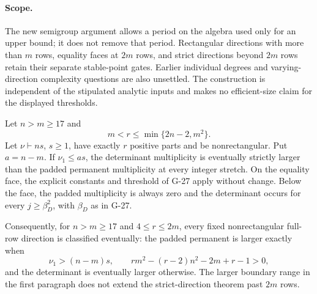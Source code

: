 \paragraph{Scope.}
The new semigroup argument allows a period on the algebra
used only for an upper bound; it does not remove that period.
Rectangular directions with more than $m$ rows, equality
faces at $2m$ rows, and strict directions beyond $2m$ rows
retain their separate stable-point gates. Earlier individual
degrees and varying-direction complexity questions are also
unsettled. The construction is independent of the stipulated
analytic inputs and makes no efficient-size claim for the
displayed thresholds.


\begin{theorem}
\label{G-28}
Let $n>m\ge17$ and
\[
                  m<r\le\min\{2n-2,m^2\}.
\]
Let $\nu\vdash ns$, $s\ge1$, have exactly $r$ positive
parts and be nonrectangular. Put $a=n-m$. If $\nu_1\le as$,
the determinant multiplicity is eventually strictly larger
than the padded permanent multiplicity at every integer
stretch. On the equality face, the explicit constants and
threshold of G-27 apply without change. Below the face,
the padded multiplicity is always zero and the determinant
occurs for every $j\ge\beta_D^2$, with $\beta_D$ as in G-27.

Consequently, for $n>m\ge17$ and $4\le r\le2m$, every
fixed nonrectangular full-row direction is classified
eventually: the padded permanent is larger exactly when
\[
 \nu_1>(n-m)s,\qquad
 rm^2-(r-2)n^2-2m+r-1>0,
\]
and the determinant is eventually larger otherwise.
The larger boundary range in the first paragraph does not
extend the strict-direction theorem past $2m$ rows.
\end{theorem}

